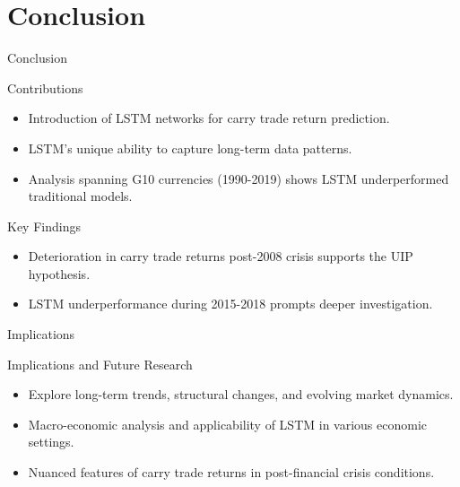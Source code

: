 \documentclass{beamer}
\begin{document}
\section{Conclusion}

\begin{frame}{Conclusion}
    \begin{block}{Contributions}
        \begin{itemize}
            \item Introduction of LSTM networks for carry trade return prediction.
            \item LSTM's unique ability to capture long-term data patterns.
            \item Analysis spanning G10 currencies (1990-2019) shows LSTM underperformed traditional models.
        \end{itemize}
    \end{block}

    \begin{block}{Key Findings}
        \begin{itemize}
            \item Deterioration in carry trade returns post-2008 crisis supports the UIP hypothesis.
            \item LSTM underperformance during 2015-2018 prompts deeper investigation.
        \end{itemize}
    \end{block}
\end{frame}

\begin{frame}{Implications}
    \begin{block}{Implications and Future Research}
        \begin{itemize}
            \item Explore long-term trends, structural changes, and evolving market dynamics.
            \item Macro-economic analysis and applicability of LSTM in various economic settings.
            \item Nuanced features of carry trade returns in post-financial crisis conditions.
        \end{itemize}
    \end{block}
\end{frame}




\end{document}
